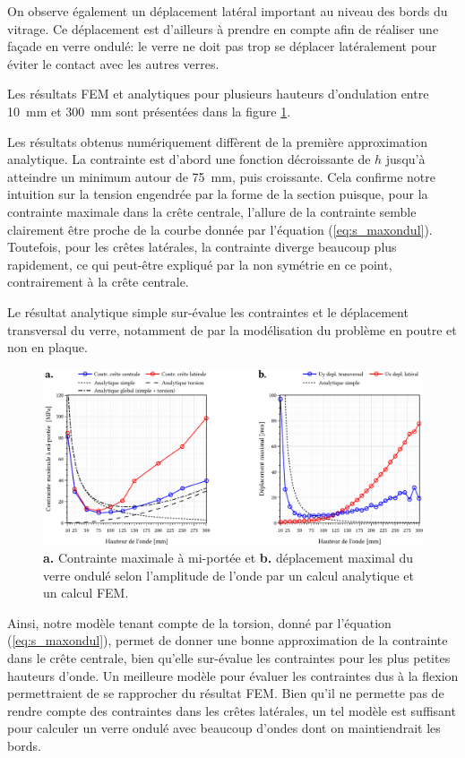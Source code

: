 \documentclass[11pt,titlepage]{article}
\begin{document}
On observe également un déplacement latéral important au niveau des bords du vitrage. Ce déplacement est d'ailleurs à prendre en compte afin de réaliser une façade en verre ondulé: le verre ne doit pas trop se déplacer latéralement pour éviter le contact avec les autres verres.

Les résultats \acrshort{FEM} et analytiques pour plusieurs hauteurs d'ondulation entre \qty{10}{\milli\meter} et \qty{300}{\milli\meter} sont présentées dans la figure \ref{fig:ondulfem1}. 

Les résultats obtenus numériquement diffèrent de la première approximation analytique. La contrainte est d'abord une fonction décroissante de $h$ jusqu'à atteindre un minimum autour de \qty{75}{\milli\meter}, puis croissante. Cela confirme notre intuition sur la tension engendrée par la forme de la section puisque, pour la contrainte maximale dans la crête centrale, l'allure de la contrainte semble clairement être proche de la courbe donnée par l'équation (\ref{eq:s_maxondul}). Toutefois, pour les crêtes latérales, la contrainte diverge beaucoup plus rapidement, ce qui peut-être expliqué par la non symétrie en ce point, contrairement à la crête centrale. 

Le résultat analytique simple sur-évalue les contraintes et le déplacement transversal du verre, notamment de par la modélisation du problème en poutre et non en plaque. 

\begin{figure}[H]
    \centering
    \includegraphics[width=\linewidth]{img/ondul/fem/simple_fem.pdf}
    \caption{\textbf{a.} Contrainte maximale à mi-portée et \textbf{b.} déplacement maximal du verre ondulé selon l'amplitude de l'onde par un calcul analytique et un calcul \acrshort{FEM}.}
    \label{fig:ondulfem1}
\end{figure}



Ainsi, notre modèle tenant compte de la torsion, donné par l'équation (\ref{eq:s_maxondul}), permet de donner une bonne approximation de la contrainte dans le crête centrale, bien qu'elle sur-évalue les contraintes pour les plus petites hauteurs d'onde. Un meilleure modèle pour évaluer les contraintes dus à la flexion permettraient de se rapprocher du résultat \acrshort{FEM}. Bien qu'il ne permette pas de rendre compte des contraintes dans les crêtes latérales, un tel modèle est suffisant pour calculer un verre ondulé avec beaucoup d'ondes dont on maintiendrait les bords.
\end{document}
